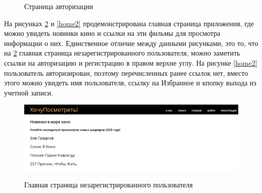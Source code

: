 \documentclass[a4paper, 14pt]{article}
\begin{document}
	\newpage
	\begin{figure}[h!]
		\caption{Страница авторизации}
		\label{login}
	\end{figure}

	На рисунках \ref{home1} и \ref{home2} продемонстрирована главная страница приложения, где можно увидеть новинки кино и ссылки на эти фильмы для просмотра информации о них. Единственное отличие между данными рисунками, это то, что на \ref{home1} главная страница незарегистрированного пользователя, можно заметить ссылки на авторизацию и регистрацию в правом верхне углу. На рисунке \ref{home2} пользователь авторизирован, поэтому перечисленных ранее ссылок нет, вместо этого можно увидеть имя пользователя, ссылку на Избранное и кпопку выхода из учетной записи.

	\begin{figure}[h!]
		{\includegraphics[scale=0.5]{img/7.JPG}}
		\caption{Главная страница незарегистрированного пользователя}
		\label{home1}
	\end{figure}
	
\end{document}
